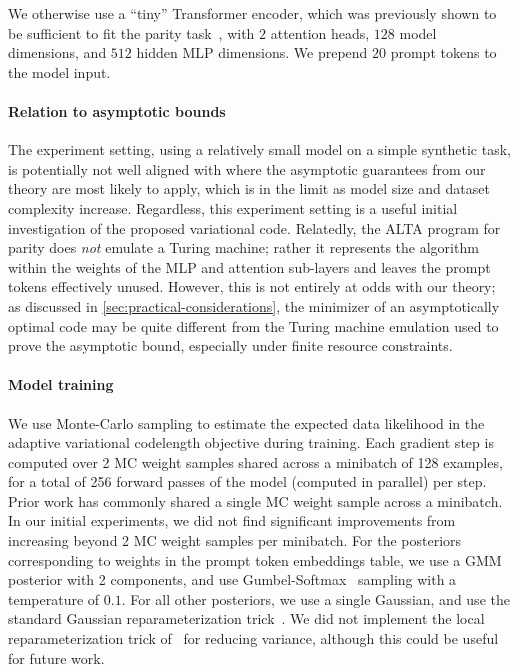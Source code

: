 We otherwise use a ``tiny'' Transformer encoder, which was previously shown to be sufficient to fit the parity task~\citep{shaw2024alta}, with $2$ attention heads, $128$ model dimensions, and $512$ hidden MLP dimensions. We prepend $20$ prompt tokens to the model input.

\paragraph{Relation to asymptotic bounds} The experiment setting, using a relatively small model on a simple synthetic task, is potentially not well aligned with where the asymptotic guarantees from our theory are most likely to apply, which is in the limit as model size and dataset complexity increase. Regardless, this experiment setting is a useful initial investigation of the proposed variational code. Relatedly, the ALTA program for parity does \emph{not} emulate a Turing machine; rather it represents the algorithm within the weights of the MLP and attention sub-layers and leaves the prompt tokens effectively unused. However, this is not entirely at odds with our theory; as discussed in \ref{sec:practical-considerations}, the minimizer of an asymptotically optimal code may be quite different from the Turing machine emulation used to prove the asymptotic bound, especially under finite resource constraints.

\paragraph{Model training}

We use Monte-Carlo sampling to estimate the expected data likelihood in the adaptive variational codelength objective during training. 
Each gradient step is computed over 2 MC weight samples shared across a minibatch of 128 examples, for a total of 256 forward passes of the model (computed in parallel) per step. Prior work has commonly shared a single MC weight sample across a minibatch. In our initial experiments, we did not find significant improvements from increasing beyond 2 MC weight samples per minibatch. For the posteriors corresponding to weights in the prompt token embeddings table, we use a GMM posterior with 2 components, and use Gumbel-Softmax~\citep{jang2017categorical,maddison2017concrete} sampling with a temperature of $0.1$. For all other posteriors, we use a single Gaussian, and use the standard Gaussian reparameterization trick~\citep{kingma2014auto}. We did not implement the local reparameterization trick of~\citet{kingma2015variational} for reducing variance, although this could be useful for future work.

